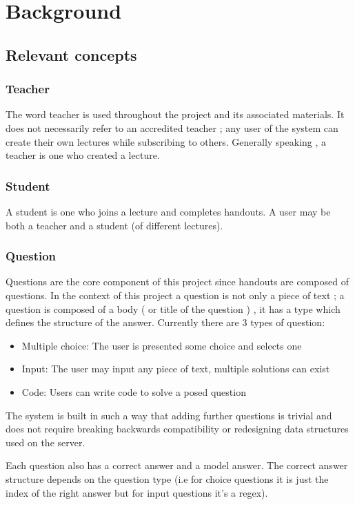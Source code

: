 \chapter{Background}
\section{Relevant concepts}

\subsection{Teacher}
The word teacher is used throughout the project and its associated materials. It does not necessarily refer to an accredited teacher ; any user of the system can create their own lectures while subscribing to others. Generally speaking , a teacher is one who created a lecture.

\subsection{Student}
A student is one who joins a lecture and completes handouts. A user may be both a teacher and a student (of different lectures).

\subsection{Question}
Questions are the core component of this project since handouts are composed of questions. In the context of this project a question is not only a piece of text ; a question is composed of a body ( or title of the question ) , it has a type which defines the structure of the answer. Currently there are 3 types of question:

\begin{itemize}
\item Multiple choice: The user is presented some choice and selects one
\item Input: The user may input any piece of text, multiple solutions can exist
\item Code: Users can write code to solve a posed question
\end{itemize}

The system is built in such a way that adding further questions is trivial and does not require breaking backwards compatibility or redesigning data structures used on the server.

Each question also has a correct answer and a model answer. The correct answer structure depends on the question type (i.e for choice questions it is just the index of the right answer but for input questions it's a regex).

